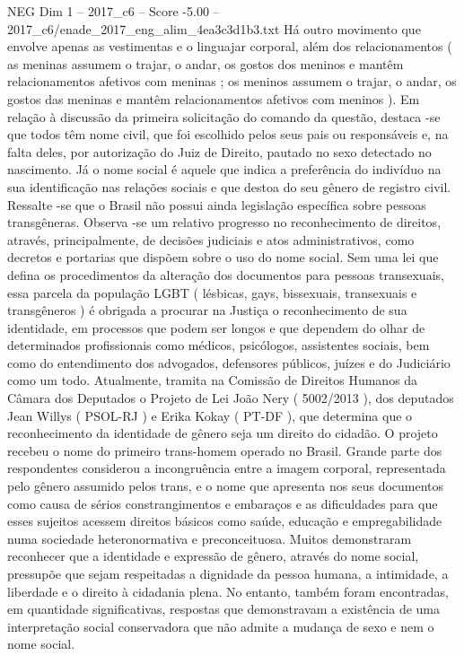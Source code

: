 \begin{textsample}{NEG Dim 1 – 2017\_c6 – Score -5.00 – 2017\_c6/enade\_2017\_eng\_alim\_4ea3c3d1b3.txt}
Há outro movimento que envolve apenas as vestimentas e o linguajar corporal, além dos relacionamentos ( as meninas assumem o trajar, o andar, os gostos dos meninos e mantêm relacionamentos afetivos com meninas ; os meninos assumem o trajar, o andar, os gostos das meninas e mantêm relacionamentos afetivos com meninos ).
Em relação à discussão da primeira solicitação do comando da questão, destaca -se que todos têm nome civil, que foi escolhido pelos seus pais ou responsáveis e, na falta deles, por autorização do Juiz de Direito, pautado no sexo detectado no nascimento.
Já o nome social é aquele que indica a preferência do indivíduo na sua identificação nas relações sociais e que destoa do seu gênero de registro civil.
Ressalte -se que o Brasil não possui ainda legislação específica sobre pessoas transgêneras.
Observa -se um relativo progresso no reconhecimento de direitos, através, principalmente, de decisões judiciais e atos administrativos, como decretos e portarias que dispõem sobre o uso do nome social.
Sem uma lei que defina os procedimentos da alteração dos documentos para pessoas transexuais, essa parcela da população LGBT ( lésbicas, gays, bissexuais, transexuais e transgêneros ) é obrigada a procurar na Justiça o reconhecimento de sua identidade, em processos que podem ser longos e que dependem do olhar de determinados profissionais como médicos, psicólogos, assistentes sociais, bem como do entendimento dos advogados, defensores públicos, juízes e do Judiciário como um todo.
Atualmente, tramita na Comissão de Direitos Humanos da Câmara dos Deputados o Projeto de Lei João Nery ( 5002/2013 ), dos deputados Jean Willys ( PSOL-RJ ) e Erika Kokay ( PT-DF ), que determina que o reconhecimento da identidade de gênero seja um direito do cidadão.
O projeto recebeu o nome do primeiro trans-homem operado no Brasil.
Grande parte dos respondentes considerou a incongruência entre a imagem corporal, representada pelo gênero assumido pelos trans, e o nome que apresenta nos seus documentos como causa de sérios constrangimentos e embaraços e as dificuldades para que esses sujeitos acessem direitos básicos como saúde, educação e empregabilidade numa sociedade heteronormativa e preconceituosa.
Muitos demonstraram reconhecer que a identidade e expressão de gênero, através do nome social, pressupõe que sejam respeitadas a dignidade da pessoa humana, a intimidade, a liberdade e o direito à cidadania plena.
No entanto, também foram encontradas, em quantidade significativas, respostas que demonstravam a existência de uma interpretação social conservadora que não admite a mudança de sexo e nem o nome social.

\end{textsample}
